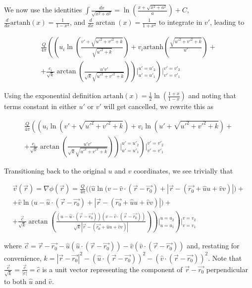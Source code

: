﻿\documentclass{article}
\begin{document}
We now use the identities $\int \frac{dx}{\sqrt{x^2 + a^2}} = \ln \left( \frac{x + \sqrt{x^2 + a^2}}{a} \right) + C$, $\frac{d}{dx} \text{artanh}(x) = \frac{1}{1 - x^2}$, and $\frac{d}{dx} \arctan(x) = \frac{1}{1 + x^2}$ to integrate in $v'$, leading to

\begin{multline*}
    \frac{Q}{4 \pi} \left( \left( u_i \ln \left( \frac{v' + \sqrt{u'^2 + v'^2 + k}}{\sqrt{u'^2 + k}} \right) + v_i \text{artanh} \left( \frac{\sqrt{u'^2 + v'^2 + k}}{u'} \right) + \right. \right. \\
    \left. \left. + \frac{c_i}{\sqrt{k}} \arctan \left( \frac{u' v'}{\sqrt{k} \sqrt{u'^2 + v'^2 + k}} \right) \right) \bigg|_{u' = u'_1}^{u' = u'_2} \right) \bigg|_{v' = v'_1}^{v' = v'_2}
\end{multline*}

Using the exponential definition $\text{artanh}(x) = \frac{1}{2} \ln \left( \frac{1 + x}{1 - x} \right)$ and noting that terms constant in either $u'$ or $v'$ will get cancelled, we rewrite this as

\begin{multline*}
    \frac{Q}{4 \pi} \left( \left( u_i \ln \left( v' + \sqrt{u'^2 + v'^2 + k} \right) + v_i \ln \left( u' + \sqrt{u'^2 + v'^2 + k} \right) + \right. \right. \\
    \left. \left. + \frac{c_i}{\sqrt{k}} \arctan \left( \frac{u' v'}{\sqrt{k} \sqrt{u'^2 + v'^2 + k}} \right) \right) \bigg|_{u' = u'_1}^{u' = u'_2} \right) \bigg|_{v' = v'_1}^{v' = v'_2}
\end{multline*}

Transitioning back to the original $u$ and $v$ coordinates, we see trivially that

\begin{multline}
    \label{eq:SolutionToTheEffectOfARectangularSourcePanelOnTheVelocity}
    \vec{v}(\vec{r}) = \nabla \phi(\vec{r}) = \frac{Q}{4 \pi} \Bigg( \bigg( \hat{u} \ln \big( v - \hat{v} \cdot (\vec{r} - \vec{r_0}) + |\vec{r} - (\vec{r_0} + \hat{u} u + \hat{v} v)| \big) + \\
    + \hat{v} \ln \big( u - \hat{u} \cdot (\vec{r} - \vec{r_0}) + |\vec{r} - (\vec{r_0} + \hat{u} u + \hat{v} v)| \big) + \\
    \left. \left. + \frac{\vec{c}}{\sqrt{k}} \arctan \left( \frac{(u - \hat{u} \cdot (\vec{r} - \vec{r_0})) (v - \hat{v} \cdot (\vec{r} - \vec{r_0}))}{\sqrt{k} |\vec{r} - (\vec{r_0} + \hat{u} u + \hat{v} v)|} \right) \right) \bigg|_{u = u_1}^{u = u_2} \right) \bigg|_{v = v_1}^{v = v_2}
\end{multline}

where $\vec{c} = \vec{r}  - \vec{r_0} - \hat{u} (\hat{u} \cdot (\vec{r} - \vec{r_0})) - \hat{v} (\hat{v} \cdot (\vec{r} - \vec{r_0}))$ and, restating for convenience, $k = |\vec{r} - \vec{r_0}|^2 - (\hat{u} \cdot (\vec{r} - \vec{r_0}))^2 - (\hat{v} \cdot (\vec{r} - \vec{r_0}))^2$. Note that $\frac{\vec{c}}{\sqrt{k}} = \frac{\vec{c}}{|c|} = \hat{c}$ is a unit vector representing the component of $\vec{r} - \vec{r_0}$ perpendicular to both $\hat{u}$ and $\hat{v}$.
\end{document}
